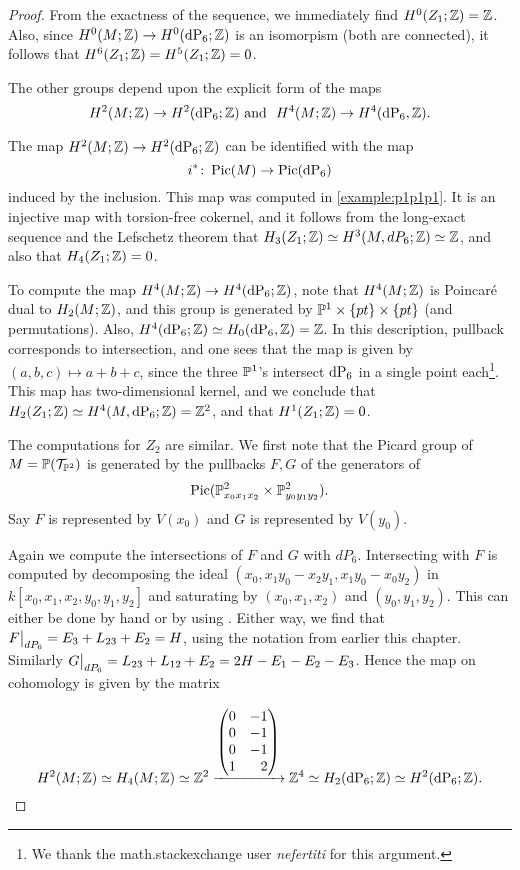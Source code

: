 \begin{proof}
From the exactness of the sequence, we immediately find $H^0(Z_1;\Z)=\Z$. Also, since $H^0(M;\Z) \to H^0(\dP6;\Z)$ is an isomorpism (both are connected), it follows that $H^6(Z_1;\Z)=H^5(Z_1;\Z)=0$.

The other groups depend upon the explicit form of the maps \[{H^2(M;\Z) \to H^2(\dP6;\Z)} \text{ and } {H^4(M;\Z) \to H^4(\dP6,\Z)}.\]

The map $H^2(M;\Z) \to H^2(\dP6;\Z)$ can be identified with the map \[{i^\ast \colon \Pic(M) \to \Pic(\dP6)}\] induced by the inclusion. This map was computed in \cref{example:p1p1p1}. It is an injective map with torsion-free cokernel, and it follows from the long-exact sequence and the Lefschetz theorem that $H_3(Z_1;\Z) \simeq H^3(M,dP_6; \Z) \simeq \Z$, and also that $H_4(Z_1;\Z)=0$.

To compute the map $H^4(M;\Z) \to H^4(\dP6;\Z)$, note that $H^4(M;\Z)$ is Poincaré dual to $H_ 2(M;\Z)$, and this group is generated by $\P^1 \times \{pt\} \times \{ pt\}$ (and permutations). Also, $H^4(\dP6;\Z) \simeq H_0(\dP6,\Z)=\Z$. In this description, pullback corresponds to intersection, and one sees that the map is given by $(a,b,c) \mapsto a+b+c$, since the three $\P^1$'s intersect $\dP6$ in a single point each\footnote{We thank the math.stackexchange user \emph{nefertiti} for this argument.}. This map has two-dimensional kernel, and we conclude that $H_2(Z_1;\Z) \simeq H^4(M,\dP6;\Z) = \Z^2$, and that $H^1(Z_1;\Z)=0$.

The computations for $Z_2$ are similar. We first note that the Picard group of $M=\P(\mathcal T_{\P^2})$ is generated by the pullbacks $F,G$ of the generators of
\[
{\Pic(\P^2_{x_0x_1x_2} \times \P^2_{y_0y_1y_2})}.
\]
Say $F$ is represented by $V(x_0)$ and $G$ is represented by $V(y_0)$.

Again we compute the intersections of $F$ and $G$ with $dP_6$. Intersecting with $F$ is computed by decomposing the ideal $(x_0,x_1y_0-x_2y_1,x_1y_0-x_0y_2)$ in $k[x_0,x_1,x_2,y_0,y_1,y_2]$ and saturating by $(x_0,x_1,x_2)$ and $(y_0,y_1,y_2)$. This can either be done by hand or by using \MM. Either way, we find that $\restr{F}{dP_6} = E_3+L_{23} + E_2=H$, using the notation from earlier this chapter. Similarly $\restr{G}{dP_6}=L_{23}+L_{12}+E_2=2H-E_1-E_2-E_3$. Hence the map on cohomology is given by the matrix

\[
H^2(M;\Z) \simeq H_4(M;\Z) \simeq \Z^2 \xrightarrow{
	\begin{pmatrix*}[r]
	0 & -1 \\
	0 & -1 \\
	0 & -1  \\
	1 & 2 
	\end{pmatrix*}
} \Z^4 \simeq H_2(\dP6;\Z) \simeq H^2(\dP6;\Z).
\]


\end{proof}
